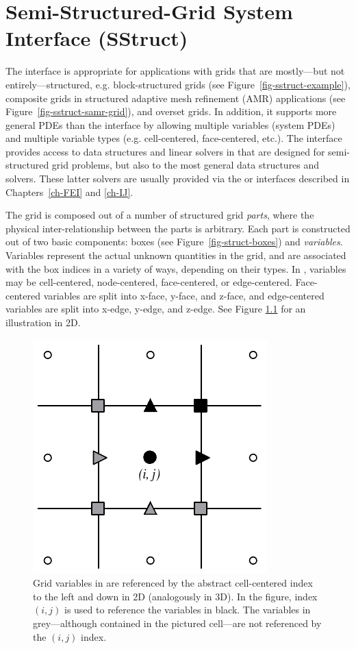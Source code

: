 
\chapter{Semi-Structured-Grid System Interface (SStruct)}
\label{ch-SStruct}

The  interface is appropriate for applications with grids that
are mostly---but not entirely---structured, e.g. block-structured grids (see
Figure~\ref{fig-sstruct-example}), composite grids in structured adaptive mesh
refinement (AMR) applications (see Figure~\ref{fig-sstruct-samr-grid}), and
overset grids.  In addition, it supports more general PDEs than the
 interface by allowing multiple variables (system PDEs) and
multiple variable types (e.g. cell-centered, face-centered, etc.).  The
interface provides access to data structures and linear solvers in \hypre{}
that are designed for semi-structured grid problems, but also to the most
general data structures and solvers.  These latter solvers are usually provided
via the  or  interfaces described in Chapters~\ref{ch-FEI}
and \ref{ch-IJ}.

The  grid is composed out of a number of structured grid {\em
parts}, where the physical inter-relationship between the parts is arbitrary.
Each part is constructed out of two basic components: boxes (see
Figure~\ref{fig-struct-boxes}) and {\em variables}.  Variables represent the
actual unknown quantities in the grid, and are associated with the box indices
in a variety of ways, depending on their types.  In \hypre{}, variables may be
cell-centered, node-centered, face-centered, or edge-centered.  Face-centered
variables are split into x-face, y-face, and z-face, and edge-centered
variables are split into x-edge, y-edge, and z-edge.  See Figure
\ref{fig-gridvars} for an illustration in 2D.

\begin{figure}
\centering
\includegraphics[width=.3\textwidth]{figSStructGridVars}
\caption{%
Grid variables in \hypre{} are referenced by the abstract cell-centered index
to the left and down in 2D (analogously in 3D).  In the figure, index $(i,j)$
is used to reference the variables in black.  The variables in grey---although
contained in the pictured cell---are not referenced by the $(i,j)$ index.}
\label{fig-gridvars}
\end{figure}

